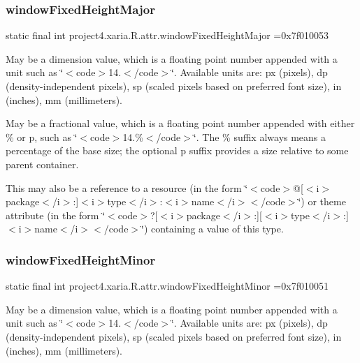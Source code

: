 \subsubsection{\texorpdfstring{window\+Fixed\+Height\+Major}{windowFixedHeightMajor}}
{\footnotesize\ttfamily static final int project4.\+xaria.\+R.\+attr.\+window\+Fixed\+Height\+Major =0x7f010053\hspace{0.3cm}{\ttfamily [static]}}

May be a dimension value, which is a floating point number appended with a unit such as \char`\"{}$<$code$>$14.\+5sp$<$/code$>$\char`\"{}. Available units are\+: px (pixels), dp (density-\/independent pixels), sp (scaled pixels based on preferred font size), in (inches), mm (millimeters). 

May be a fractional value, which is a floating point number appended with either \% or p, such as \char`\"{}$<$code$>$14.\%$<$/code$>$\char`\"{}. The \% suffix always means a percentage of the base size; the optional p suffix provides a size relative to some parent container. 

This may also be a reference to a resource (in the form \char`\"{}$<$code$>$@\mbox{[}$<$i$>$package$<$/i$>$\+:\mbox{]}$<$i$>$type$<$/i$>$\+:$<$i$>$name$<$/i$>$$<$/code$>$\char`\"{}) or theme attribute (in the form \char`\"{}$<$code$>$?\mbox{[}$<$i$>$package$<$/i$>$\+:\mbox{]}\mbox{[}$<$i$>$type$<$/i$>$\+:\mbox{]}$<$i$>$name$<$/i$>$$<$/code$>$\char`\"{}) containing a value of this type. \mbox{\label{classproject4_1_1xaria_1_1R_1_1attr_a0e1fcaf24690792c76ae309ee7216fef}} 
\subsubsection{\texorpdfstring{window\+Fixed\+Height\+Minor}{windowFixedHeightMinor}}
{\footnotesize\ttfamily static final int project4.\+xaria.\+R.\+attr.\+window\+Fixed\+Height\+Minor =0x7f010051\hspace{0.3cm}{\ttfamily [static]}}

May be a dimension value, which is a floating point number appended with a unit such as \char`\"{}$<$code$>$14.\+5sp$<$/code$>$\char`\"{}. Available units are\+: px (pixels), dp (density-\/independent pixels), sp (scaled pixels based on preferred font size), in (inches), mm (millimeters). 

